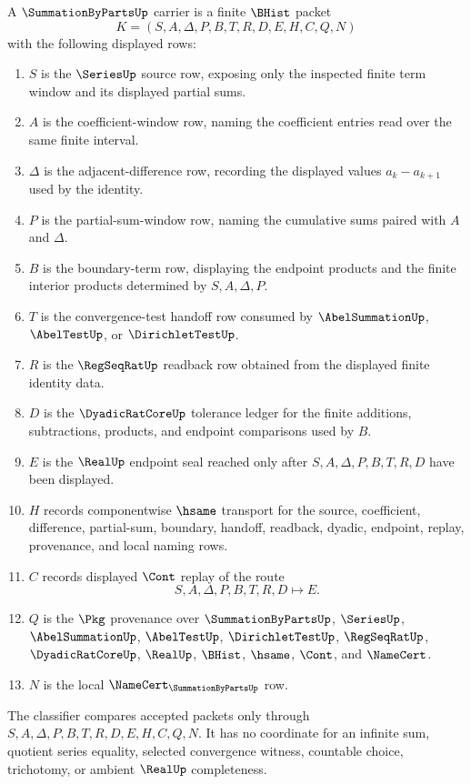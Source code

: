 \begin{definition}
\label{def:summation-by-parts-carrier}
A $\SummationByPartsUp$ carrier is a finite $\BHist$ packet
$$
K=(S,A,\Delta,P,B,T,R,D,E,H,C,Q,N)
$$
with the following displayed rows:
\begin{enumerate}
\item $S$ is the $\SeriesUp$ source row, exposing only the inspected finite term window and its displayed partial sums.
\item $A$ is the coefficient-window row, naming the coefficient entries read over the same finite interval.
\item $\Delta$ is the adjacent-difference row, recording the displayed values $a_k-a_{k+1}$ used by the identity.
\item $P$ is the partial-sum-window row, naming the cumulative sums paired with $A$ and $\Delta$.
\item $B$ is the boundary-term row, displaying the endpoint products and the finite interior products determined by $S,A,\Delta,P$.
\item $T$ is the convergence-test handoff row consumed by $\AbelSummationUp$, $\AbelTestUp$, or $\DirichletTestUp$.
\item $R$ is the $\RegSeqRatUp$ readback row obtained from the displayed finite identity data.
\item $D$ is the $\DyadicRatCoreUp$ tolerance ledger for the finite additions, subtractions, products, and endpoint comparisons used by $B$.
\item $E$ is the $\RealUp$ endpoint seal reached only after $S,A,\Delta,P,B,T,R,D$ have been displayed.
\item $H$ records componentwise $\hsame$ transport for the source, coefficient, difference, partial-sum, boundary, handoff, readback, dyadic, endpoint, replay, provenance, and local naming rows.
\item $C$ records displayed $\Cont$ replay of the route
$$
S,A,\Delta,P,B,T,R,D \longmapsto E .
$$
\item $Q$ is the $\Pkg$ provenance over $\SummationByPartsUp$, $\SeriesUp$, $\AbelSummationUp$, $\AbelTestUp$, $\DirichletTestUp$, $\RegSeqRatUp$, $\DyadicRatCoreUp$, $\RealUp$, $\BHist$, $\hsame$, $\Cont$, and $\NameCert$.
\item $N$ is the local $\NameCert_{\SummationByPartsUp}$ row.
\end{enumerate}
The classifier compares accepted packets only through $S,A,\Delta,P,B,T,R,D,E,H,C,Q,N$. It has no coordinate for an infinite sum, quotient series equality, selected convergence witness, countable choice, trichotomy, or ambient $\RealUp$ completeness.
\end{definition}

